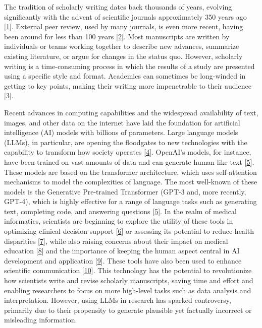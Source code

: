 \documentclass[
]{article}
\begin{document}
The tradition of scholarly writing dates back thousands of years, evolving significantly with the advent of scientific journals approximately 350 years ago {[}\protect\hyperlink{ref-F3iZfGUC}{1}{]}.
External peer review, used by many journals, is even more recent, having been around for less than 100 years {[}\protect\hyperlink{ref-1HMhNrQq1}{2}{]}.
Most manuscripts are written by individuals or teams working together to describe new advances, summarize existing literature, or argue for changes in the status quo.
However, scholarly writing is a time-consuming process in which the results of a study are presented using a specific style and format.
Academics can sometimes be long-winded in getting to key points, making their writing more impenetrable to their audience {[}\protect\hyperlink{ref-19YWsShi0}{3}{]}.

Recent advances in computing capabilities and the widespread availability of text, images, and other data on the internet have laid the foundation for artificial intelligence (AI) models with billions of parameters.
Large language models (LLMs), in particular, are opening the floodgates to new technologies with the capability to transform how society operates {[}\protect\hyperlink{ref-xq1uEbPa}{4}{]}.
OpenAI's models, for instance, have been trained on vast amounts of data and can generate human-like text {[}\protect\hyperlink{ref-bYOaJHMe}{5}{]}.
These models are based on the transformer architecture, which uses self-attention mechanisms to model the complexities of language.
The most well-known of these models is the Generative Pre-trained Transformer (GPT-3 and, more recently, GPT-4), which is highly effective for a range of language tasks such as generating text, completing code, and answering questions {[}\protect\hyperlink{ref-bYOaJHMe}{5}{]}.
In the realm of medical informatics, scientists are beginning to explore the utility of these tools in optimizing clinical decision support {[}\protect\hyperlink{ref-gRhoGuC4}{6}{]} or assessing its potential to reduce health disparities {[}\protect\hyperlink{ref-CYB5vhZp}{7}{]}, while also raising concerns about their impact on medical education {[}\protect\hyperlink{ref-h8wInPLE}{8}{]} and the importance of keeping the human aspect central in AI development and application {[}\protect\hyperlink{ref-Z2ek25Ak}{9}{]}.
These tools have also been used to enhance scientific communication {[}\protect\hyperlink{ref-Svww2RUh}{10}{]}.
This technology has the potential to revolutionize how scientists write and revise scholarly manuscripts, saving time and effort and enabling researchers to focus on more high-level tasks such as data analysis and interpretation.
However, using LLMs in research has sparked controversy, primarily due to their propensity to generate plausible yet factually incorrect or misleading information.
\end{document}
